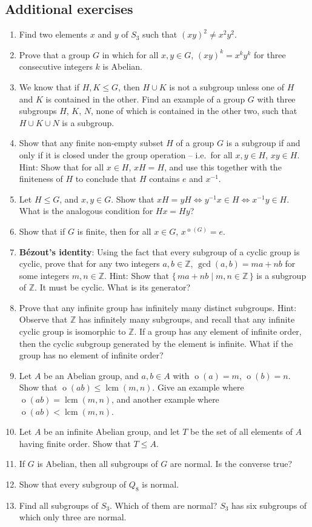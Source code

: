 \documentclass[svgnames]{article}
\theoremstyle{definition}
\theoremstyle{remark}
\DeclareMathOperator{\ord}{o}
\DeclareMathOperator{\lcm}{lcm}
\begin{document}
\begin{appendices}
\section{Additional exercises}\label{sec:Exercises}
\begin{enumerate}
\item Find two elements $x$ and $y$ of $S_3$ such that $(xy)^2 \ne x^2 y^2$.
\item Prove that a group $G$ in which for all $x,y \in G$, $(xy)^k = x^k y^k$ for three consecutive integers $k$ is Abelian.
\item We know that if $H, K \le G$, then $H \cup K$ is not a subgroup unless one of $H$ and $K$ is contained in the other. Find an example of a group $G$ with three subgroups $H$, $K$, $N$, none of which is contained in the other two, such that $H \cup K \cup N$ is a subgroup.
\item Show that any finite non-empty subset $H$ of a group $G$ is a subgroup if and only if it is closed under the group operation -- i.e.\ for all $x, y \in H$, $xy \in H$. {\tiny Hint: Show that for all $x \in H$, $xH = H$, and use this together with the finiteness of $H$ to conclude that $H$ contains $e$ and $x^{-1}$.}
\item Let $H \le G$, and $x, y \in G$. Show that $xH = yH \iff y^{-1}x \in H \iff x^{-1}y \in H$. What is the analogous condition for $Hx = Hy$?
\item Show that if $G$ is finite, then for all $x \in G$, $x^{\ord(G)} = e$.
\item \textbf{B\'ezout's identity}: Using the fact that every subgroup of a cyclic group is cyclic, prove that for any two integers $a, b \in \mathbb Z$, $\gcd(a,b) = ma + nb$ for some integers $m, n \in \mathbb Z$. {\tiny Hint: Show that $\{\, ma + nb \mid m, n \in \mathbb Z \,\}$ is a subgroup of $\mathbb Z$. It must be cyclic. What is its generator?}
\item Prove that any infinite group has infinitely many distinct subgroups. {\tiny Hint: Observe that $\mathbb Z$ has infinitely many subgroups, and recall that any infinite cyclic group is isomorphic to $\mathbb Z$. If a group has any element of infinite order, then the cyclic subgroup generated by the element is infinite. What if the group has no element of infinite order?}
\item Let $A$ be an Abelian group, and $a, b \in A$ with $\ord(a) = m$, $\ord(b) = n$. Show that $\ord(ab) \le \lcm(m, n)$. Give an example where $\ord(ab) = \lcm(m,n)$, and another example where $\ord(ab) < \lcm(m,n)$.
\item Let $A$ be an infinite Abelian group, and let $T$ be the set of all elements of $A$ having finite order. Show that $T \le A$.
\item If $G$ is Abelian, then all subgroups of $G$ are normal. Is the converse true?
\item Show that every subgroup of $Q_8$ is normal.
\item Find all subgroups of $S_3$. Which of them are normal? {\tiny $S_3$ has six subgroups of which only three are normal.}
\end{enumerate}
\end{appendices}
\end{document}
